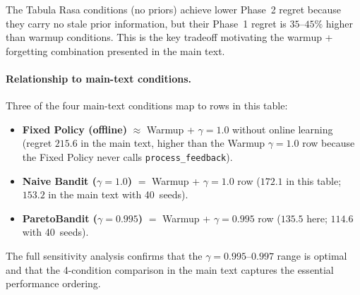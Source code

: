 The Tabula Rasa conditions (no priors) achieve lower Phase~2
regret because they carry no stale prior information, but their
Phase~1 regret is $35$--$45\%$ higher than warmup conditions.
This is the key tradeoff motivating the warmup + forgetting
combination presented in the main text.

\paragraph{Relationship to main-text conditions.}
Three of the four main-text conditions map to rows in this table:
\begin{itemize}[nosep,leftmargin=*]
  \item \textbf{Fixed Policy (offline)} $\approx$ Warmup +
    $\gamma{=}1.0$ without online learning (regret $215.6$
    in the main text, higher than the Warmup $\gamma{=}1.0$ row
    because the Fixed Policy never calls \texttt{process\_feedback}).
  \item \textbf{Naive Bandit ($\gamma{=}1.0$)} $=$ Warmup +
    $\gamma{=}1.0$ row ($172.1$ in this table; $153.2$ in the
    main text with 40~seeds).
  \item \textbf{ParetoBandit ($\gamma{=}0.995$)} $=$ Warmup +
    $\gamma{=}0.995$ row ($135.5$ here; $114.6$ with 40~seeds).
\end{itemize}

\noindent
The full sensitivity analysis confirms that the
$\gamma{=}0.995$--$0.997$ range is optimal and that the
4-condition comparison in the main text captures the essential
performance ordering.
